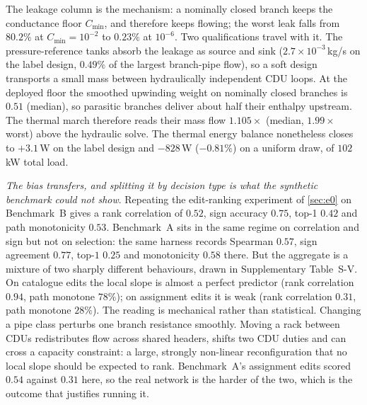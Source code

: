 \documentclass[journal]{IEEEtran}
\begin{document}
The leakage column is the mechanism: a nominally closed branch keeps the
conductance floor $C_{\min}$, and therefore keeps flowing; the worst leak falls from
$80.2\%$ at $C_{\min}=10^{-2}$ to $0.23\%$ at $10^{-6}$.  Two qualifications travel with it.  The pressure-reference tanks absorb the
leakage as source and sink ($2.7\times10^{-3}$\,kg/s on the label design,
$0.49\%$ of the largest branch-pipe flow), so a soft design transports a small
mass between hydraulically independent CDU loops.  At the deployed floor the smoothed upwinding weight on
nominally closed branches is $0.51$ (median), so parasitic branches deliver about
half their enthalpy upstream.  The thermal march therefore reads their mass flow
$1.105\times$ (median,
$1.99\times$ worst) above the hydraulic solve.  The thermal energy balance
nonetheless closes to $+3.1$\,W on the label design and $-828$\,W ($-0.81\%$) on a
uniform draw, of $102$\,kW total load.


\emph{The bias transfers, and splitting it by decision type is what the synthetic
benchmark could not show}.  Repeating the edit-ranking experiment of \cref{sec:e0} on
Benchmark~B gives a rank correlation of $0.52$, sign accuracy $0.75$, top-1 $0.42$ and
path monotonicity $0.53$.  Benchmark~A sits in the same regime on correlation and sign
but not on selection: the same harness records Spearman $0.57$, sign agreement $0.77$,
top-$1$ $0.25$ and monotonicity $0.58$ there.
But the aggregate is a mixture of two sharply different behaviours, drawn in
Supplementary Table~S-V.  On
catalogue edits the local slope is almost a perfect predictor (rank correlation
$0.94$, path monotone $78\%$); on assignment edits it is weak (rank correlation
$0.31$, path monotone $28\%$).  The reading is mechanical rather than statistical.  Changing a pipe class perturbs
one branch resistance smoothly.  Moving a rack between CDUs redistributes flow across
shared headers, shifts two CDU duties and can cross a capacity constraint: a large,
strongly non-linear reconfiguration that no local slope should be expected to rank.  Benchmark~A's assignment edits scored $0.54$
against $0.31$ here, so the real network is the harder of the two, which is the
outcome that justifies running it.
\end{document}

